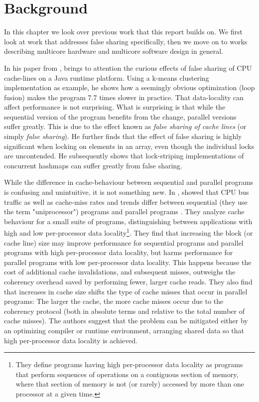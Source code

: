 \chapter{Background}
\label{chap:background}
In this chapter we look over previous work that this report builds on. We first
look at work that addresses false sharing specifically, then we move on to works
describing multicore hardware and multicore software design in general.

In his paper \cite{mystery} from \citeyear{mystery}, \citeauthor{mystery} brings
to attention the curious effects of false sharing of CPU cache-lines on a Java
runtime platform. Using a k-means clustering implementation as example, he shows
how a seemingly obvious optimization (loop fusion) makes the program 7.7 times
slower in practice. That data-locality can affect performance is not surprising.
What is surprising is that while the sequential version of the program benefits
from the change, parallel versions suffer greatly. This is due to the effect
known as \textit{false sharing of cache lines} (or simply \textit{false
sharing}). He further finds that the effect of false sharing is highly
significant when locking on elements in an array, even though the individual
locks are uncontended. He subsequently shows that lock-striping implementations
of concurrent hashmaps can suffer greatly from false sharing.

While the difference in cache-behaviour between sequential and parallel programs
is confusing and unintuitive, it is not something new. In \citeyear{eggersbus},
\citeauthor{eggersbus} showed that CPU bus traffic as well as cache-miss
rates and trends differ between sequential (they use the term "uniprocessor")
programs and parallel programs \cite{eggersbus}.
They analyze cache behaviour for a small suite of programs, distinguishing
between applications with high and low per-processor data locality\footnote{They
define programs having high per-processor data locality as programs that perform
sequences of operations on a contiguous section of memory, where that section of
memory is not (or rarely) accessed by more than one processor at a given time.}.
They find that increasing the block (or cache line) size may improve
performance for sequential programs and parallel programs with high
per-processor data locality, but harms performance for parallel programs with
low per-processor data locality. This happens because the cost of additional cache
invalidations, and subsequent misses, outweighs the coherency overhead saved by
performing fewer, larger cache reads. They also find that increases in cache
size shifts the type of cache misses that occur in parallel programs: The larger
the cache, the more cache misses occur due to the coherency protocol (both in
absolute terms and relative to the total number of cache misses). The authors
suggest that the problem can be mitigated either by an optimizing compiler or
runtime environment, arranging shared data so that high per-processor data
locality is achieved.

